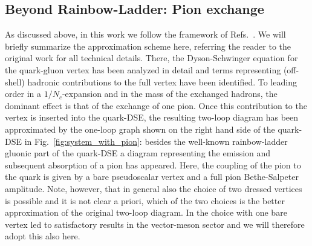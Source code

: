 \subsection*{Beyond Rainbow-Ladder: Pion exchange}
\label{subsec:pion_exchange}


As discussed above, in this work we follow the framework of 
Refs.~\cite{Fischer:2007ze,Fischer:2008sp,Fischer:2008wy}. We will briefly summarize
the approximation scheme here, referring the reader to the original work for 
all technical details. There, the Dyson-Schwinger
equation for the quark-gluon vertex has been analyzed in detail and terms
representing (off-shell) hadronic contributions to the full vertex have been 
identified. To leading order in a $1/N_c$-expansion and in the mass of the 
exchanged hadrons, the dominant effect is that of the exchange of one pion.
Once this contribution to the vertex is inserted into the quark-DSE, the 
resulting two-loop diagram has been approximated by the one-loop graph shown
on the right hand side of the quark-DSE in Fig.~\ref{fig:system_with_pion}:
besides the well-known rainbow-ladder gluonic part of the quark-DSE a 
diagram representing the emission and subsequent absorption of a pion has 
appeared. Here, the coupling of the pion to the quark is given by a bare
pseudoscalar vertex and a full pion Bethe-Salpeter amplitude. Note, however, that
in general also the choice of two dressed vertices is possible and it is not 
clear a priori, which of the two choices is the better approximation of the
original two-loop diagram. In \cite{Fischer:2008wy} the choice
with one bare vertex led to satisfactory results in the vector-meson
sector and we will therefore adopt this also here.

